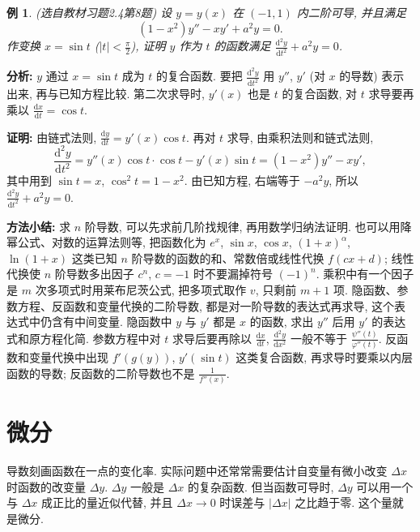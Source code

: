 \documentclass[UTF8,openany]{ctexbook}
\theoremstyle{chinesetextbook}
\newtheorem{example}{例}[section]
\newenvironment{cnproof}{\par\indent\textbf{证明:} \ignorespaces}{\par}
\newcommand{\dd}{\mathrm d}
\begin{document}
\begin{example}\label{ex:c2-h4-8}
\textnormal{(选自教材习题2.4第8题)} 设 $y=y(x)$ 在 $(-1,1)$ 内二阶可导, 并且满足
\[
(1-x^2)y''-xy'+a^2y=0.
\]
作变换 $x=\sin t$ ($\displaystyle|t|<\frac\pi2$), 证明 $y$ 作为 $t$ 的函数满足 $\displaystyle\frac{\dd^2y}{\dd t^2}+a^2y=0$.
\end{example}
\par\indent\textbf{分析:} $y$ 通过 $x=\sin t$ 成为 $t$ 的复合函数. 要把 $\displaystyle\frac{\dd^2y}{\dd t^2}$ 用 $y''$, $y'$ (对 $x$ 的导数) 表示出来, 再与已知方程比较. 第二次求导时, $y'(x)$ 也是 $t$ 的复合函数, 对 $t$ 求导要再乘以 $\displaystyle\frac{\dd x}{\dd t}=\cos t$.
\begin{cnproof}
由链式法则, $\displaystyle\frac{\dd y}{\dd t}=y'(x)\cos t$. 再对 $t$ 求导, 由乘积法则和链式法则,
\[
\frac{\dd^2y}{\dd t^2}=y''(x)\cos t\cdot\cos t-y'(x)\sin t=(1-x^2)y''-xy',
\]
其中用到 $\sin t=x$, $\cos^2t=1-x^2$. 由已知方程, 右端等于 $-a^2y$, 所以 $\displaystyle\frac{\dd^2y}{\dd t^2}+a^2y=0$.
\end{cnproof}
\par\indent\textbf{方法小结:} 求 $n$ 阶导数, 可以先求前几阶找规律, 再用数学归纳法证明. 也可以用降幂公式、对数的运算法则等, 把函数化为 $e^x$, $\sin x$, $\cos x$, $(1+x)^\alpha$, $\ln(1+x)$ 这类已知 $n$ 阶导数的函数的和、常数倍或线性代换 $f(cx+d)$; 线性代换使 $n$ 阶导数多出因子 $c^n$, $c=-1$ 时不要漏掉符号 $(-1)^n$. 乘积中有一个因子是 $m$ 次多项式时用莱布尼茨公式, 把多项式取作 $v$, 只剩前 $m+1$ 项. 隐函数、参数方程、反函数和变量代换的二阶导数, 都是对一阶导数的表达式再求导, 这个表达式中仍含有中间变量. 隐函数中 $y$ 与 $y'$ 都是 $x$ 的函数, 求出 $y''$ 后用 $y'$ 的表达式和原方程化简. 参数方程中对 $t$ 求导后要再除以 $\displaystyle\frac{\dd x}{\dd t}$, $\displaystyle\frac{\dd^2y}{\dd x^2}$ 一般不等于 $\displaystyle\frac{\psi''(t)}{\varphi''(t)}$. 反函数和变量代换中出现 $f'(g(y))$, $y'(\sin t)$ 这类复合函数, 再求导时要乘以内层函数的导数; 反函数的二阶导数也不是 $\displaystyle\frac1{f''(x)}$.
\section{微分}
导数刻画函数在一点的变化率. 实际问题中还常常需要估计自变量有微小改变 $\Delta x$ 时函数的改变量 $\Delta y$. $\Delta y$ 一般是 $\Delta x$ 的复杂函数. 但当函数可导时, $\Delta y$ 可以用一个与 $\Delta x$ 成正比的量近似代替, 并且 $\Delta x\to0$ 时误差与 $|\Delta x|$ 之比趋于零. 这个量就是微分.
\end{document}
